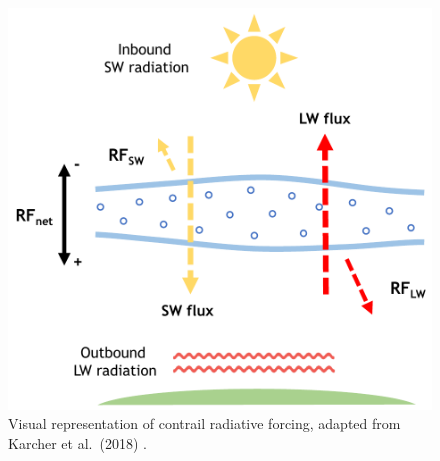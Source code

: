 
\begin{figure}[H]
  \centering
  \includegraphics[width=0.55\linewidth]{RFDIAG.pdf}
  \caption{Visual representation of contrail radiative forcing, adapted from Karcher et al.\ (2018) \cite{Karcher2018}.}
  \label{RFDIAG}
\end{figure}

